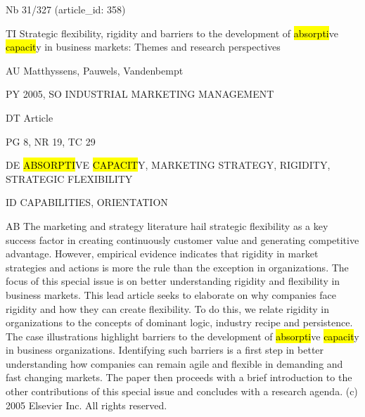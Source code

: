 \documentclass[a4paper]{article}
\begin{document}
\vspace*{-2cm}
Nb \tabto{0cm}31/327 (article\_id: 358)\par
TI \tabto{0cm}Strategic flexibility, rigidity and barriers to the development of \hl{absorpti}ve \hl{capacit}y in business markets: Themes and research perspectives\par
AU \tabto{0cm}Matthyssens, Pauwels, Vandenbempt\par
PY \tabto{0cm}2005, SO INDUSTRIAL MARKETING MANAGEMENT\par
DT \tabto{0cm}Article\par
PG \tabto{0cm}8, NR 19, TC 29\par
DE \tabto{0cm}\hl{ABSORPTI}VE \hl{CAPACIT}Y, MARKETING STRATEGY, RIGIDITY, STRATEGIC FLEXIBILITY\par
ID \tabto{0cm}CAPABILITIES, ORIENTATION\par
AB \tabto{0cm}The marketing and strategy literature hail strategic flexibility as a key success factor in creating continuously customer value and generating competitive advantage. However, empirical evidence indicates that rigidity in market strategies and actions is more the rule than the exception in organizations. The focus of this special issue is on better understanding rigidity and flexibility in business markets. This lead article seeks to elaborate on why companies face rigidity and how they can create flexibility. To do this, we relate rigidity in organizations to the concepts of dominant logic, industry recipe and persistence. The case illustrations highlight barriers to the development of \hl{absorpti}ve \hl{capacit}y in business organizations. Identifying such barriers is a first step in better understanding how companies can remain agile and flexible in demanding and fast changing markets. The paper then proceeds with a brief introduction to the other contributions of this special issue and concludes with a research agenda. (c) 2005 Elsevier Inc. All rights reserved.\par
\clearpage
\end{document}
